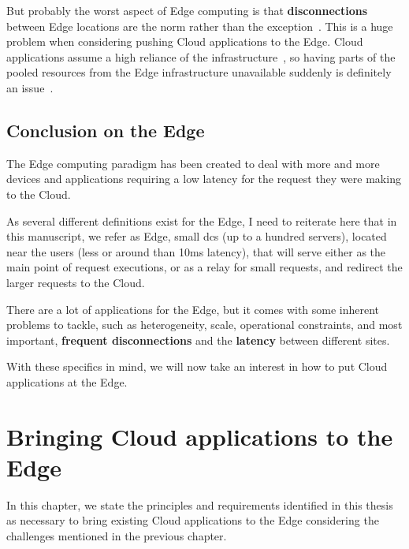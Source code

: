 %
But probably the worst aspect of Edge computing is that
\textbf{disconnections} between Edge locations are the norm rather
than the exception~\cite{SR21, IRPCM22}.
%
This is a huge problem when considering pushing Cloud applications to
the Edge.
%
Cloud applications assume a high reliance of the
infrastructure~\cite{Tamiru21}, so having parts of the pooled
resources from the Edge infrastructure unavailable suddenly is
definitely an issue~\cite{JS20}.

\section{Conclusion on the Edge} %
\label{sec:ccedge}

The Edge computing paradigm has been created to deal with more and
more devices and applications requiring a low latency for the request
they were making to the Cloud.

As several different definitions exist for the Edge, I need to
reiterate here that in this manuscript, we refer as Edge, small
\glspl{dc} (up to a hundred servers), located near the users (less or
around than 10ms latency), that will serve either as the main point of
request executions, or as a relay for small requests, and redirect the
larger requests to the Cloud.

There are a lot of applications for the Edge, but it comes with some
inherent problems to tackle, such as heterogeneity, scale,
operational constraints, and most important, \textbf{frequent
disconnections} and the \textbf{latency} between different sites.

With these specifics in mind, we will now take an interest in how to
put Cloud applications at the Edge.


\chapter{Bringing Cloud applications to the Edge} %
\label{chap:cloud-app-to-edge}



In this chapter, we state the principles and requirements identified
in this thesis as necessary to bring existing Cloud applications to
the Edge considering the challenges mentioned in the previous chapter.



